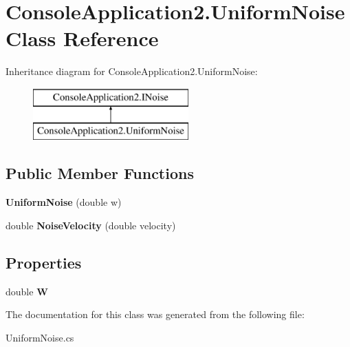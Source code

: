 \hypertarget{class_console_application2_1_1_uniform_noise}{}\section{Console\+Application2.\+Uniform\+Noise Class Reference}
\label{class_console_application2_1_1_uniform_noise}
Inheritance diagram for Console\+Application2.\+Uniform\+Noise\+:\begin{figure}[H]
\begin{center}
\leavevmode
\includegraphics[height=2.000000cm]{class_console_application2_1_1_uniform_noise}
\end{center}
\end{figure}
\subsection*{Public Member Functions}
\begin{DoxyCompactItemize}
\item 
\hypertarget{class_console_application2_1_1_uniform_noise_a53f90382c332a9873325d36076b846d9}{}{\bfseries Uniform\+Noise} (double w)\label{class_console_application2_1_1_uniform_noise_a53f90382c332a9873325d36076b846d9}

\item 
\hypertarget{class_console_application2_1_1_uniform_noise_a0c525817fdc916c31969376abbe3426a}{}double {\bfseries Noise\+Velocity} (double velocity)\label{class_console_application2_1_1_uniform_noise_a0c525817fdc916c31969376abbe3426a}

\end{DoxyCompactItemize}
\subsection*{Properties}
\begin{DoxyCompactItemize}
\item 
\hypertarget{class_console_application2_1_1_uniform_noise_af682171238b2ba6a9ef23f6196b2f10f}{}double {\bfseries W}\label{class_console_application2_1_1_uniform_noise_af682171238b2ba6a9ef23f6196b2f10f}

\end{DoxyCompactItemize}


The documentation for this class was generated from the following file\+:\begin{DoxyCompactItemize}
\item 
Uniform\+Noise.\+cs\end{DoxyCompactItemize}

